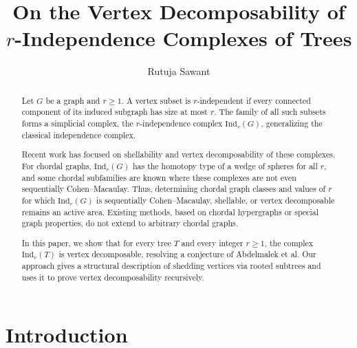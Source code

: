 \documentclass[12pt,reqno]{amsart}
\theoremstyle{definition}
\def\Ind{\mathrm{Ind}}
\begin{document}
\title{On the Vertex Decomposability of $r$-Independence Complexes of Trees}

\author{Rutuja Sawant}
\address{Chennai Mathematical Institute, Siruseri, Tamil Nadu, India}



\vspace*{-0.4cm}
\begin{abstract}
Let $G$ be a graph and $r \ge 1$. A vertex subset is $r$-independent if every connected component of its induced subgraph has size at most $r$. The family of all such subsets forms a simplicial complex, the $r$-independence complex $\Ind_r(G)$, generalizing the classical independence complex.

Recent work has focused on shellability and vertex decomposability of these complexes. For chordal graphs, $\Ind_r(G)$ has the homotopy type of a wedge of spheres for all $r$, and some chordal subfamilies are known where these complexes are not even sequentially Cohen–Macaulay. Thus, determining chordal graph classes and values of $r$ for which $\Ind_r(G)$ is sequentially Cohen–Macaulay, shellable, or vertex decomposable remains an active area. Existing methods, based on chordal hypergraphs or special graph properties, do not extend to arbitrary chordal graphs.

In this paper, we show that for every tree $T$ and every integer $r \ge 1$, the complex $\Ind_r(T)$ is vertex decomposable, resolving a conjecture \cite[Conjecture 3.15]{PD23chordal} of Abdelmalek et al. Our approach gives a structural description of shedding vertices via rooted subtrees and uses it to prove vertex decomposability recursively.
\end{abstract}

\maketitle

\section{Introduction}
\end{document}
